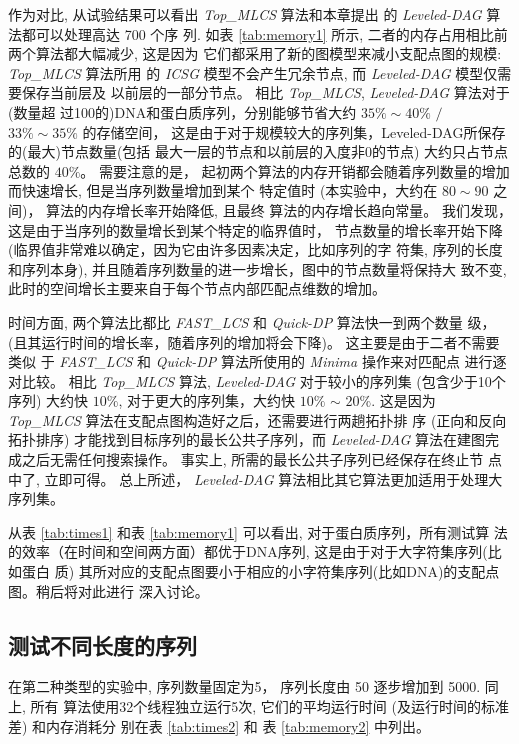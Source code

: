 \documentclass[utf8]{frontiersSCNS} %
\begin{document}
作为对比, 从试验结果可以看出 \emph{Top\_MLCS} 算法和本章提出
的 \emph{Leveled-DAG} 算法都可以处理高达 700 个序
列. 如表 \ref{tab:memory1} 所示, 二者的内存占用相比前两个算法都大幅减少, 这是因为
它们都采用了新的图模型来减小支配点图的规模: \emph{Top\_MLCS} 算法所用
的 \emph{ICSG} 模型不会产生冗余节点, 而 \emph{Leveled-DAG} 模型仅需要保存当前层及
以前层的一部分节点。 相比 \emph{Top\_MLCS}, \emph{Leveled-DAG} 算法对于(数量超
过100的)DNA和蛋白质序列，分别能够节省大约 $35\% \sim 40\%$ $/$ $33\% \sim 35\%$
的存储空间， 这是由于对于规模较大的序列集，Leveled-DAG所保存的(最大)节点数量(包括
最大一层的节点和以前层的入度非0的节点) 大约只占节点总数的 $40\%$。 需要注意的是，
起初两个算法的内存开销都会随着序列数量的增加而快速增长, 但是当序列数量增加到某个
特定值时 (本实验中，大约在 $80 \sim 90$ 之间)， 算法的内存增长率开始降低, 且最终
算法的内存增长趋向常量。 我们发现，这是由于当序列的数量增长到某个特定的临界值时，
节点数量的增长率开始下降 (临界值非常难以确定，因为它由许多因素决定，比如序列的字
符集, 序列的长度和序列本身), 并且随着序列数量的进一步增长，图中的节点数量将保持大
致不变, 此时的空间增长主要来自于每个节点内部匹配点维数的增加。

时间方面, 两个算法比都比 \emph{FAST\_LCS} 和 \emph{Quick-DP} 算法快一到两个数量
级，(且其运行时间的增长率，随着序列的增加将会下降)。 这主要是由于二者不需要类似
于 \emph{FAST\_LCS} 和 \emph{Quick-DP} 算法所使用的 \emph{Minima} 操作来对匹配点
进行逐对比较。 相比 \emph{Top\_MLCS} 算法, \emph{Leveled-DAG} 对于较小的序列集
(包含少于10个序列) 大约快 $10\%$, 对于更大的序列集，大约快 $10\%$ $\sim$
$20\%$. 这是因为 \emph{Top\_MLCS} 算法在支配点图构造好之后，还需要进行两趟拓扑排
序 (正向和反向拓扑排序) 才能找到目标序列的最长公共子序列，而 \emph{Leveled-DAG}
算法在建图完成之后无需任何搜索操作。 事实上, 所需的最长公共子序列已经保存在终止节
点中了, 立即可得。 总上所述， \emph{Leveled-DAG} 算法相比其它算法更加适用于处理大
序列集。

从表 \ref{tab:times1} 和表 \ref{tab:memory1} 可以看出, 对于蛋白质序列，所有测试算
法的效率（在时间和空间两方面）都优于DNA序列, 这是由于对于大字符集序列(比如蛋白
质) 其所对应的支配点图要小于相应的小字符集序列(比如DNA)的支配点图。稍后将对此进行
深入讨论。


\subsection{测试不同长度的序列}
\label{sec:times2}

在第二种类型的实验中, 序列数量固定为5， 序列长度由 50 逐步增加到 5000. 同上, 所有
算法使用32个线程独立运行5次, 它们的平均运行时间 (及运行时间的标准差) 和内存消耗分
别在表 \ref{tab:times2} 和 表 \ref{tab:memory2} 中列出。
\end{document}
